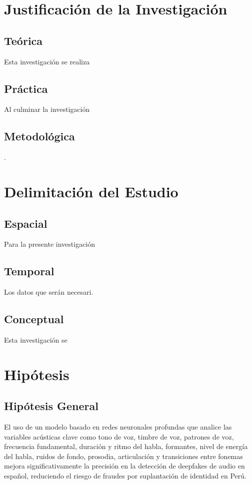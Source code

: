 \section{Justificación de la Investigación}

\subsection{Teórica}
Esta investigación se realiza 

\subsection{Práctica}
Al culminar la investigación 

\subsection{Metodológica}. 

\section{Delimitación del Estudio}

\subsection{Espacial}
Para la presente investigación 

\subsection{Temporal}
Los datos que serán necesari. 

\subsection{Conceptual}
Esta investigación se 

\section{Hipótesis}

\subsection{Hipótesis General}
\newcommand{\HipotesisGeneral}{
El uso de un modelo basado en redes neuronales profundas que analice las variables acústicas clave como tono de voz, timbre de voz, patrones de voz, frecuencia fundamental, duración y ritmo del habla, formantes, nivel de energía del habla, ruidos de fondo, prosodia, articulación y transiciones entre fonemas mejora significativamente la precisión en la detección de deepfakes de audio en español, reduciendo el riesgo de fraudes por suplantación de identidad en Perú.
}
\HipotesisGeneral
